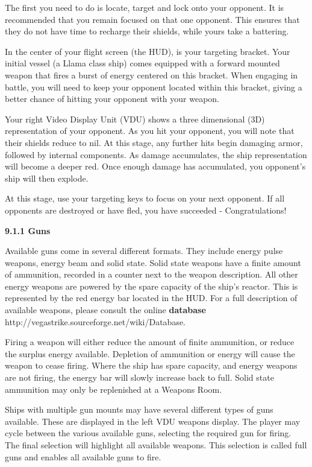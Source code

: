 \documentclass{article}
\begin{document}
The first you need to do is locate, target and lock onto your opponent. It is recommended that you remain focused on that one opponent. This ensures that they do not have time to recharge their shields, while yours take a battering. 

In the center of your flight screen (the HUD), is your targeting bracket. Your initial vessel (a Llama class ship) comes equipped with a forward mounted weapon that fires a burst of energy centered on this bracket. When engaging in battle, you will need to keep your opponent located within this bracket, giving a better chance of hitting your opponent with your weapon. 

Your right Video Display Unit (VDU) shows a three dimensional (3D) representation of your opponent. As you hit your opponent, you will note that their shields reduce to nil. At this stage, any further hits begin damaging armor, followed by internal components. As damage accumulates, the ship representation will become a deeper red. Once enough damage has accumulated, you opponent's ship will then explode. 

At this stage, use your targeting keys to focus on your next opponent. If all opponents are destroyed or have fled, you have succeeded - Congratulations! 

\textbf{}

\textbf{9.1.1 Guns }

Available guns come in several different formats. They include energy pulse weapons, energy beam and solid state. Solid state weapons have a finite amount of ammunition, recorded in a counter next to the weapon description. All other energy weapons are powered by the spare capacity of the ship's reactor. This is represented by the red energy bar located in the HUD. For a full description of available weapons, please consult the online \textbf{database} http://vegastrike.sourceforge.net/wiki/Database.

Firing a weapon will either reduce the amount of finite ammunition, or reduce the surplus energy available. Depletion of ammunition or energy will cause the weapon to cease firing. Where the ship has spare capacity, and energy weapons are not firing, the energy bar will slowly increase back to full. Solid state ammunition may only be replenished at a Weapons Room. 

Ships with multiple gun mounts may have several different types of guns available. These are displayed in the left VDU weapons display. The player may cycle between the various available guns, selecting the required gun for firing. The final selection will highlight all available weapons. This selection is called full guns and enables all available guns to fire. 
\end{document}
